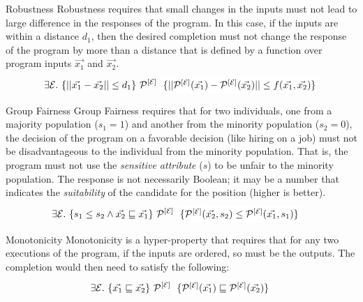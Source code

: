 \begin{frame}{Robustness}
    Robustness requires that small changes in the inputs must not lead to large difference in the responses of the program. In this case, if the inputs are within a distance $d_1$, then the desired completion must not change the response of the program by more than a distance that is defined by a function over program inputs $\vec{x_1}$ and $\vec{x_2}$.
    \begin{align*}
        \exists \E. \ \{|| \vec{x_1} - \vec{x_2} || \leq d_1\} \ \proghole{}{\E} \ \colorbox{white}{$\{|| \proghole{}{\E}(\vec{x_1}) - \proghole{}{\E}(\vec{x_2}) || \leq f(\vec{x_1},\vec{x_2})\} $}
    \end{align*}
\end{frame}

\begin{frame}{Group Fairness}
    Group Fairness requires that for two individuals, one from a majority population ($s_1 = 1$) and another from the minority population ($s_2 = 0$), the decision of the program on a favorable decision (like hiring on a job) must not be disadvantageous to the individual from the minority population.  That is, the program must not use the \textit{sensitive attribute} ($s$) to be unfair to the minority population. The response is not necessarily Boolean; it may be a number that indicates the \textit{suitability} of the candidate for the position (higher is better).
    \begin{align*}
        \exists \E. \ \{{s_1} \leq {s_2} \land \vec{x_2} \sqsubseteq \vec{x_1}\} \ \proghole{}{\E} \ & \colorbox{white}{$\{\proghole{}{\E}(\vec{x_2}, {s_2}) \leq \proghole{}{\E}(\vec{x_1}, {s_1})\} $}
    \end{align*}
\end{frame}

\begin{frame}{Monotonicity}
    Monotonicity is a hyper-property that requires that for any two executions of the program, if the inputs are ordered, so must be the outputs. The completion would then need to satisfy the following:
    \begin{align*}
        \exists \E. \ \{\vec{x_1} \sqsubseteq \vec{x_2}\} \ \proghole{}{\E}\ \colorbox{white}{$\{ \proghole{}{\E}(\vec{x_1}) \sqsubseteq \proghole{}{\E}(\vec{x_2}) \}$}
    \end{align*}
\end{frame}